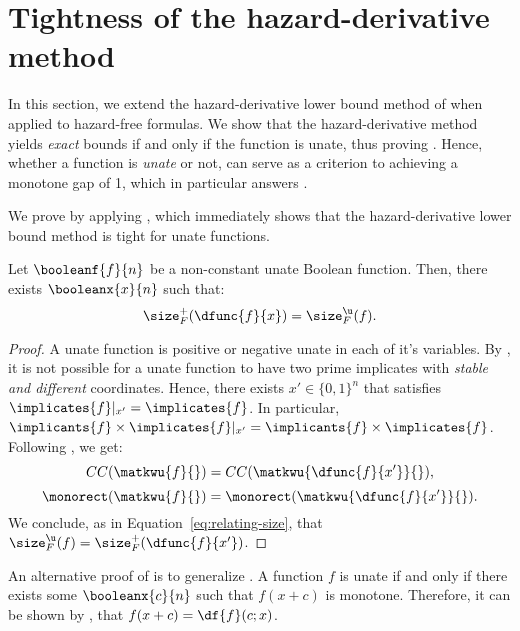 \documentclass[acmsmall, nonacm, authorversion]{acmart}
\begin{document}
\section{Tightness of the hazard-derivative method}\label{sec:tightness-of-hdm}
In this section, we extend the hazard-derivative lower bound method of \cite{IKL+19} when applied to hazard-free formulas. We show that the hazard-derivative method yields \emph{exact} bounds if and only if the function is unate, thus proving . Hence, whether a function is \emph{unate} or not, can serve as a criterion to achieving a monotone gap of 1, which in particular answers .

We prove  by applying , which immediately shows that the hazard-derivative lower bound method is tight for unate functions.

\begin{proposition}\label{prop:kw-f-not-break-if}
Let $\booleanf{f}{n}$ be a non-constant unate Boolean function. Then, there exists $\booleanx{x}{n}$ such that:
\[
\size_{F}^{+}(\dfunc{f}{x}) = \size_{F}^{\u}(f).
\]
\end{proposition}
\begin{proof}
A unate function is positive or negative unate in each of it's variables. By , it is not possible for a unate function to have two prime implicates with \emph{stable and different} coordinates. Hence, there exists $x'\in \{0,1\}^n$ that satisfies $\implicates{f}|_{x'}=\implicates{f}$. In particular, 
$\implicants{f}\times \implicates{f}|_{x'}=\implicants{f}\times \implicates{f}$. Following , we get:
\[
CC(\matkwu{f}{})=CC(\matkwu{\dfunc{f}{x'}}{}),
\]
\[
\monorect(\matkwu{f}{})=\monorect(\matkwu{\dfunc{f}{x'}}{}).
\]
We conclude, as in Equation~\eqref{eq:relating-size}, that $\size_F^\u(f)=\size_F^+(\dfunc{f}{x'})$.
\end{proof}

\begin{remark}
An alternative proof of  is to generalize \cite[Corollary 4.5]{IKL+19}. A function $f$ is unate if and only if there exists some $\booleanx{c}{n}$ such that $f(x+c)$ is monotone. Therefore, it can be shown by \cite[Lemma 4.4]{IKL+19}, that $f(x+c)=\df{f}(c;x)$.
\end{remark}
\end{document}
